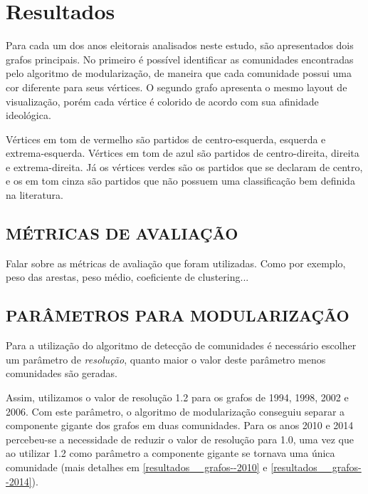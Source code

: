 \chapter{Resultados}
\label{resultados}

Para cada um dos anos eleitorais analisados neste estudo, são apresentados dois grafos principais. No primeiro é possível identificar as comunidades encontradas pelo algoritmo de modularização, de maneira que cada comunidade possui uma cor diferente para seus vértices. O segundo grafo apresenta o mesmo layout de visualização, porém cada vértice é colorido de acordo com sua afinidade ideológica.

Vértices em tom de vermelho são partidos de centro-esquerda, esquerda e extrema-esquerda. Vértices em tom de azul são partidos de centro-direita, direita e extrema-direita. Já os vértices verdes são os partidos que se declaram de centro, e os em tom cinza são partidos que não possuem uma classificação bem definida na literatura.

\section{\texorpdfstring{\MakeUppercase{Métricas de avaliação}}{}}
\label{resultados__metricas-avaliacao}

Falar sobre as métricas de avaliação que foram utilizadas. Como por exemplo, peso das arestas, peso médio, coeficiente de clustering...

\section{\texorpdfstring{\MakeUppercase{Parâmetros para modularização}}{}}
\label{resultados__parametros-modularizacao}

Para a utilização do algoritmo de detecção de comunidades é necessário escolher um parâmetro de \emph{resolução}, quanto maior o valor deste parâmetro menos comunidades são geradas.

Assim, utilizamos o valor de resolução 1.2 para os grafos de 1994, 1998, 2002 e 2006. Com este parâmetro, o algoritmo de modularização conseguiu separar a componente gigante dos grafos em duas comunidades. Para os anos 2010 e 2014 percebeu-se a necessidade de reduzir o valor de resolução para 1.0, uma vez que ao utilizar 1.2 como parâmetro a componente gigante se tornava uma única comunidade (mais detalhes em \ref{resultados__grafos--2010} e \ref{resultados__grafos--2014}).

